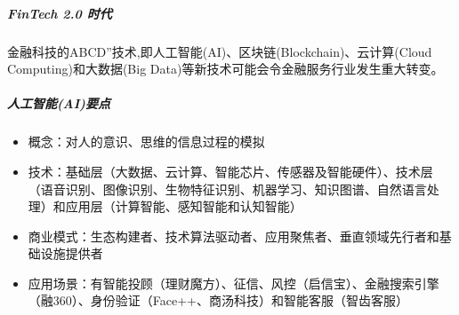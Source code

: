 \documentclass[letterpaper,10pt,english]{sphinxmanual}
\begin{document}
\subparagraph{FinTech 2.0 时代}
\label{\detokenize{chapter_AI+Finance/FinTech:fintech-2-0}}
金融科技的ABCD”技术,即人工智能(AI)、区块链(Blockchain)、云计算(Cloud
Computing)和大数据(Big
Data)等新技术可能会令金融服务行业发生重大转变。%
\begin{footnote}[1096]\sphinxAtStartFootnote
{}
%
\end{footnote}


\subparagraph{人工智能(AI)要点}
\label{\detokenize{chapter_AI+Finance/FinTech:ai}}\begin{itemize}
\item {} 
概念：对人的意识、思维的信息过程的模拟

\item {} 
技术：基础层（大数据、云计算、智能芯片、传感器及智能硬件）、技术层（语音识别、图像识别、生物特征识别、机器学习、知识图谱、自然语言处理）和应用层（计算智能、感知智能和认知智能）

\item {} 
商业模式：生态构建者、技术算法驱动者、应用聚焦者、垂直领域先行者和基础设施提供者

\item {} 
应用场景：有智能投顾（理财魔方）、征信、风控（启信宝）、金融搜索引擎（融360）、身份验证（Face++、商汤科技）和智能客服（智齿客服）

\end{itemize}
\end{document}
